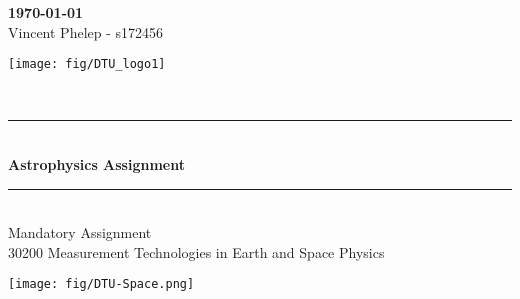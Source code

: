 \begin{titlepage}


\begin{minipage}{0.5\textwidth}
\begin{flushleft}
%
\textbf{\today} \\
\vspace{0.1cm} 
Vincent Phelep - s172456 \\


\end{flushleft}
\end{minipage}
\hfill
\begin{minipage}{0.1\textwidth}
\begin{flushright}
\texttt{[image: fig/DTU\_logo1]}
\end{flushright}
\end{minipage}\\	%


\begin{center}
\rule{\textwidth}{1mm}\\
\Huge\bfseries Astrophysics Assignment \\				%
\rule{\textwidth}{1mm}\\
\vspace{0.5cm}
\Large Mandatory Assignment\\[0.3cm]
\Large 30200 Measurement Technologies in Earth and Space Physics \\[0.5cm]
%



\vspace{0.5cm}
\end{center}

\begin{minipage}{0.3\textwidth}
\begin{flushleft}
\texttt{[image: fig/DTU-Space.png]} 	%
\end{flushleft}\end{minipage}
\end{titlepage}